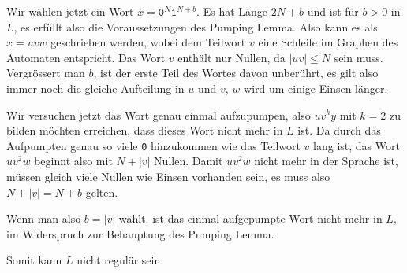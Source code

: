 \begin{loesung}
Wir wählen jetzt ein Wort $x=\texttt{0}^N\texttt{1}^{N+b}$.
Es hat Länge $2N+b$ und ist für $b>0$ in $L$, es erfüllt also die
Voraussetzungen des Pumping Lemma.
Also kann es als $x=uvw$ geschrieben werden, wobei dem Teilwort $v$ eine
Schleife im Graphen des Automaten entspricht.
Das Wort $v$ enthält nur Nullen, da $|uv|\le N$ sein muss.
Vergrössert man $b$, ist der erste Teil des Wortes davon unberührt,
es gilt also immer noch die gleiche Aufteilung in $u$ und $v$,
$w$ wird um einige Einsen länger.

Wir versuchen jetzt das Wort genau einmal aufzupumpen, also $uv^ky$ mit
$k=2$ zu bilden möchten erreichen, dass dieses Wort nicht mehr in $L$
ist.
Da durch das Aufpumpten genau so viele \texttt{0} hinzukommen wie das
Teilwort $v$ lang ist, das Wort $uv^2w$ beginnt also mit $N+|v|$ Nullen.
Damit $uv^2w$ nicht mehr in der Sprache ist, müssen gleich viele Nullen
wie Einsen vorhanden sein, es muss also $N+|v|=N+b$ gelten.
\begin{center}
\end{center}
Wenn man also $b=|v|$ wählt, ist das einmal aufgepumpte Wort nicht
mehr in $L$, im Widerspruch zur Behauptung des Pumping Lemma.

Somit kann $L$ nicht regulär sein.
\end{loesung}
